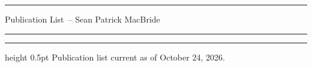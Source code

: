 \documentclass[11pt]{article}
\newcommand{\yourname}{Sean Patrick MacBride}
\newcommand{\hindexDate}{October 24, 2026}
\newcommand{\soptitle}{Publication List}
\begin{document}
\thispagestyle{plain}
\hrule
\begin{center}
    \Large\soptitle\ -- \yourname
\end{center}
\vspace{0pt}
\hrule
\vspace{0.5pt}
\hrule height 0.5pt
\vspace{12pt}
Publication list current as of \hindexDate.
\nocite{*}
\printbibliography[heading=none]
\end{document}
